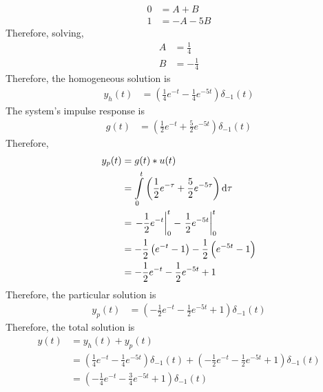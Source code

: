 \documentclass[fleqn, a4paper, 11pt, oneside]{amsart}
\theoremstyle{definition}
\theoremstyle{theorem}
\begin{document}
\begin{solution}
\begin{enumerate}[leftmargin=*]
			\begin{align*}
				0 & = A + B \\
				1 & = -A - 5 B
			\end{align*}
			Therefore, solving,
			\begin{align*}
				A & = \frac{1}{4} \\
				B & = -\frac{1}{4}
			\end{align*}
			Therefore, the homogeneous solution is
			\begin{align*}
				y_h(t) & = \left( \frac{1}{4} e^{-t} - \frac{1}{4} e^{-5 t} \right) \delta_{-1}(t)
			\end{align*}
			The system's impulse response is
			\begin{align*}
				g(t) & = \left( \frac{1}{2} e^{-t} + \frac{5}{2} e^{-5 t} \right) \delta_{-1}(t)
			\end{align*}
			Therefore,
			\begin{align*}
				y_p(t) & = g(t) \ast u(t)                                                                               \\
                                       & = \int\limits_{0}^{t} \left( \frac{1}{2} e^{-\tau} + \frac{5}{2} e^{-5 \tau} \right) \dif \tau \\
                                       & = \left. -\frac{1}{2} e^{-t} \right|_{0}^{t} - \left. \frac{1}{2} e^{-5 t} \right|_{0}^{t}     \\
                                       & = -\frac{1}{2} \left( e^{-t} - 1 \right) - \frac{1}{2} \left( e^{-5 t} - 1 \right)             \\
                                       & = -\frac{1}{2} e^{-t} - \frac{1}{2} e^{-5 t} + 1
			\end{align*}
			Therefore, the particular solution is
			\begin{align*}
				y_p(t) & = \left( -\frac{1}{2} e^{-t} - \frac{1}{2} e^{-5 t} + 1 \right) \delta_{-1}(t)
			\end{align*}
			Therefore, the total solution is
			\begin{align*}
				y(t) & = y_h(t) + y_p(t)                                                                                                                                        \\
                                     & = \left( \frac{1}{4} e^{-t} - \frac{1}{4} e^{-5 t} \right) \delta_{-1}(t) + \left( -\frac{1}{2} e^{-t} - \frac{1}{2} e^{-5 t} + 1 \right) \delta_{-1}(t) \\
                                     & = \left( -\frac{1}{4} e^{-t} - \frac{3}{4} e^{-5 t} + 1 \right) \delta_{-1}(t)
			\end{align*}
	\end{enumerate}
\end{solution}
\end{document}
